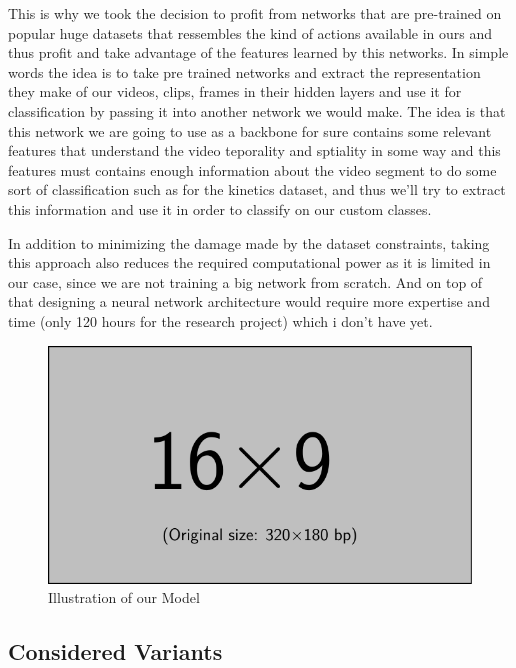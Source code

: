This is why we took the decision to profit from networks that are pre-trained on popular huge datasets that ressembles the kind of actions available in ours and thus profit and take advantage of the features learned by this networks. In simple words the idea is to take pre trained networks and extract the representation they make of our videos, clips, frames in their hidden layers and use it for classification by passing it into another network we would make.
The idea is that this network we are going to use as a backbone for sure contains some relevant features that understand the video teporality and sptiality in some way and this features must contains enough information about the video segment to do some sort of classification such as for the kinetics dataset, and thus we'll try to extract this information and use it in order to classify on our custom classes. 

In addition to minimizing the damage made by the dataset constraints, taking this approach also reduces the required computational power as it is limited in our case, since we are not training a big network from scratch. And on top of that designing a neural network architecture would require more expertise and time (only 120 hours for the research project) which i don't have yet.

\begin{figure}[t]
    \centering
    \begin{minipage}{0.49\textwidth}
        \centering
        \includegraphics[width=\textwidth]{assets/mwe/example-image-16x9}
        \caption{Illustration of our Model}
        \label{figure:local-temporal-modeling}
    \end{minipage}
\end{figure}

\subsection*{Considered Variants}

